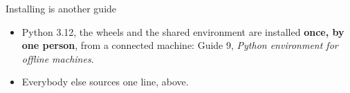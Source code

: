 \begin{frame}{Installing is another guide}
\begin{itemize}
  \item Python 3.12, the wheels and the shared environment are installed
        \textbf{once, by one person}, from a connected machine: Guide 9,
        \emph{Python environment for offline machines}.
  \item Everybody else sources one line, above.
\end{itemize}
\end{frame}
